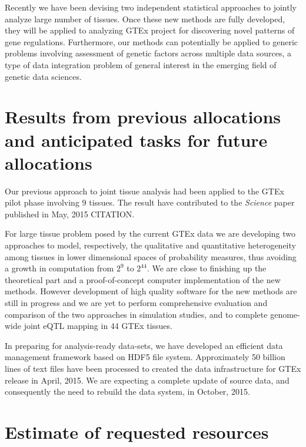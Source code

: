 \documentclass[10pt]{article}
\begin{document}
Recently we have been devising two independent statistical approaches to jointly analyze 
large number of tissues. 
Once these new methods are fully developed, they will be applied to analyzing GTEx project for discovering novel patterns of gene regulations. 
Furthermore, our methods can potentially be applied to generic problems involving assessment of genetic factors across multiple data sources, a type of data integration problem of general interest in the emerging field of genetic data sciences.
 
\section*{Results from previous allocations and anticipated tasks for future
allocations}\label{results-from-previous-allocations}

Our previous approach to joint tissue analysis had been applied to the GTEx pilot phase involving 9 tissues. 
The result have contributed to the \textit{Science} paper published in May, 2015 CITATION. 

For large tissue problem posed by the current GTEx data we are developing two approaches to model, respectively, the qualitative and quantitative heterogeneity among tissues in lower dimensional spaces of probability measures, thus avoiding a growth in computation from $2^9$ to $2^{44}$. 
We are close to finishing up the theoretical part and a proof-of-concept computer implementation of the new methods.
However development of high quality software for the new methods are still in progress and we are yet to perform comprehensive evaluation and comparison of the two approaches in simulation studies, and to complete genome-wide joint eQTL mapping in 44 GTEx tissues.

In preparing for analysis-ready data-sets, we have developed an efficient data management framework based on HDF5 file system. 
Approximately 50 billion lines of text files have been processed to created the data infrastructure for GTEx release in April, 2015. 
We are expecting a complete update of source data, and consequently the need to rebuild the data system, in October, 2015.

\section*{Estimate of requested
resources}\label{estimate-of-requested-resources}
\end{document}
